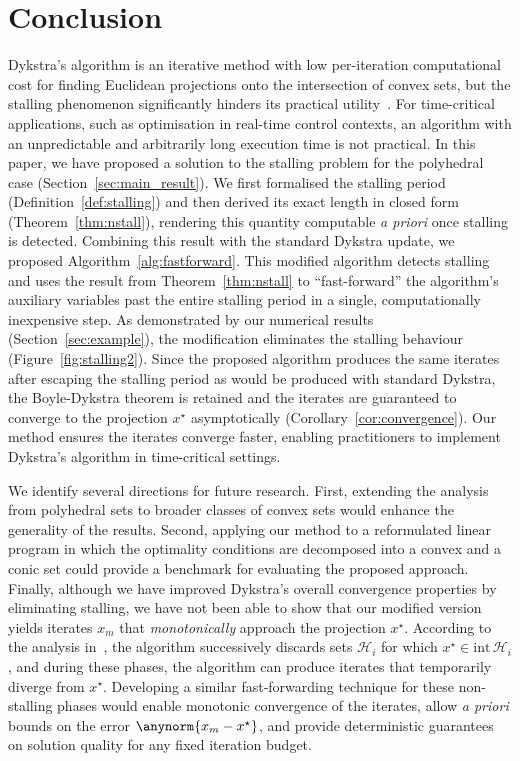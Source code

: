 \documentclass[onecolumn]{autart}
\begin{document}
\section{Conclusion}
\label{sec:conclusion}

Dykstra's algorithm is an iterative method with low per-iteration computational cost for finding Euclidean projections onto the intersection of convex sets, but the stalling phenomenon significantly hinders its practical utility~\cite{BAUSCHKESWISS}. For time-critical applications, such as optimisation in real-time control contexts, an algorithm with an unpredictable and arbitrarily long execution time is not practical. In this paper, we have proposed a solution to the stalling problem for the polyhedral case (Section~\ref{sec:main_result}). We first formalised the stalling period (Definition~\ref{def:stalling}) and then derived its exact length in closed form (Theorem~\ref{thm:nstall}), rendering this quantity computable \textit{a priori} once stalling is detected. Combining this result with the standard Dykstra update, we proposed Algorithm~\ref{alg:fastforward}. This modified algorithm detects stalling and uses the result from Theorem~\ref{thm:nstall} to ``fast-forward'' the algorithm's auxiliary variables past the entire stalling period in a single, computationally inexpensive step. As demonstrated by our numerical results (Section~\ref{sec:example}), the modification eliminates the stalling behaviour (Figure~\ref{fig:stalling2}). Since the proposed algorithm produces the same iterates after escaping the stalling period as would be produced with standard Dykstra, the Boyle-Dykstra theorem is retained and the iterates are guaranteed to converge to the projection $x^\star$ asymptotically (Corollary~\ref{cor:convergence}).
Our method ensures the iterates converge faster, enabling practitioners to implement Dykstra's algorithm in time-critical settings.

We identify several directions for future research. First, extending the analysis from polyhedral sets to broader classes of convex sets would enhance the generality of the results. Second, applying our method to a reformulated linear program in which the optimality conditions are decomposed into a convex and a conic set could provide a benchmark for evaluating the proposed approach. Finally, although we have improved Dykstra's overall convergence properties by eliminating stalling, we have not been able to show that our modified version yields iterates $x_m$ that \emph{monotonically} approach the projection $x^\star$. According to the analysis in~\cite{DYKSTRAPOLY}, the algorithm successively discards sets $\mathcal{H}_i$ for which $x^\star\in\text{int}\,\mathcal{H}_i$, and during these phases, the algorithm can produce iterates that temporarily diverge from $x^\star$. Developing a similar fast-forwarding technique for these non-stalling phases would enable monotonic convergence of the iterates, allow \textit{a priori} bounds on the error $\anynorm{x_m-x^\star}$, and provide deterministic guarantees on solution quality for any fixed iteration budget.
\end{document}
